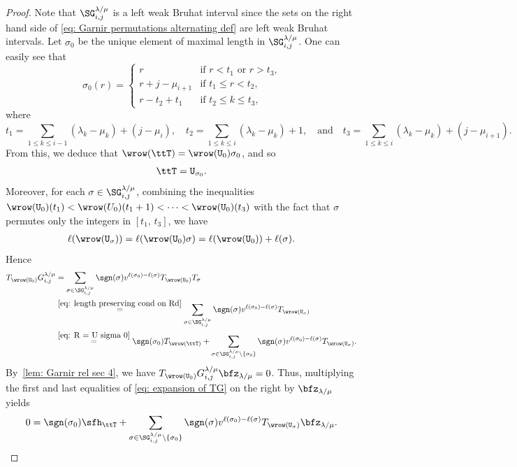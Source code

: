 \documentclass[12pt, reqno]{amsart}
\theoremstyle{plain}
\theoremstyle{definition}
\numberwithin{equation}{section}
\numberwithin{figure}{section}
\numberwithin{table}{section}
\begin{document}
\begin{proof}
Note that $\SG^{\lambda/\mu}_{i,j}$ is a left weak Bruhat interval since 
the sets on the right hand side of \cref{eq: Garnir permutations alternating def} are left weak Bruhat intervals.
Let $\sigma_0$ be the unique element of maximal length in $\SG^{\lambda/\mu}_{i,j}$.
One can easily see that
\[
\sigma_0(r) = \begin{cases}
r & \text{if $r < t_1$ or $r > t_3$,} \\
r + j - \mu_{i+1} & \text{if $t_1 \le r < t_2$,} \\
r - t_2 + t_1  & \text{if $t_2 \le k \le t_3$,}
\end{cases}
\]
where
\[
t_1 = \sum_{1 \leq k \leq i-1} (\lambda_k - \mu_k) + (j - \mu_i), \quad
t_2 = \sum_{1 \leq k \leq i} (\lambda_k - \mu_k) + 1, \quad \text{and} \quad
t_3 = \sum_{1 \leq k \leq i} (\lambda_k - \mu_k) + (j - \mu_{i+1}).
\]
From this, we deduce that $\wrow(\ttT) = \wrow(\mathtt{U}_0) \sigma_0$, and so
\begin{align}\label{eq: R = U sigma 0}
\ttT = \mathtt{U}_{\sigma_0}.
\end{align}
Moreover, for each $\sigma \in \SG^{\lambda/\mu}_{i,j}$,
combining the inequalities
$\wrow(\mathtt{U}_0)(t_1) < \wrow(U_0)(t_1 + 1) < \cdots < \wrow(\mathtt{U}_0)(t_3)$
with the fact that $\sigma$ permutes only the integers in $[t_1,\, t_3]$, we have
\begin{align}\label{eq: length preserving cond on Rd}
\ell(\wrow(\mathtt{U}_\sigma)) = \ell(\wrow(\mathtt{U}_0)\sigma)  = \ell(\wrow(\mathtt{U}_0)) + \ell(\sigma).
\end{align}
Hence
\begin{align}\label{eq: expansion of TG}
\begin{aligned}
T_{\wrow(\mathtt{U}_0)} G^{\lambda/\mu}_{i,j}
& = \sum_{\sigma \in \SG^{\lambda/\mu}_{i,j}} \sgn(\sigma) v^{\ell(\sigma_0) - \ell(\sigma)}
T_{\wrow(\mathtt{U}_0)} T_\sigma
\\
& \overset{\cref{eq: length preserving cond on Rd}}{=}  \sum_{\sigma \in \SG^{\lambda/\mu}_{i,j}} \sgn(\sigma) v^{\ell(\sigma_0) - \ell(\sigma)} T_{\wrow(\mathtt{U}_\sigma)} \\
& \overset{\cref{eq: R = U sigma 0}}{=} \sgn(\sigma_0) T_{\wrow(\ttT)} + 
\sum_{\sigma \in \SG^{\lambda/\mu}_{i,j} \setminus \{\sigma_0\}} \sgn(\sigma) v^{\ell(\sigma_0) - \ell(\sigma)} T_{\wrow(\mathtt{U}_\sigma)}.
\end{aligned}
\end{align}
By~\cref{lem: Garnir rel sec 4}, we have $T_{\wrow(\mathtt{U}_0)} G^{\lambda/\mu}_{i,j} \bfz_{\lambda/\mu} = 0$.
Thus, multiplying the first and last equalities of \cref{eq: expansion of TG} on the right by $\bfz_{\lambda/\mu}$ yields
\begin{align}\label{eq: expansion of hR}
0 = \sgn(\sigma_0)\sfh_{\ttT} + 
\sum_{\sigma \in \SG^{\lambda/\mu}_{i,j} \setminus \{\sigma_0\}} \sgn(\sigma) v^{\ell(\sigma_0) - \ell(\sigma)} T_{\wrow(\mathtt{U}_\sigma)} \bfz_{\lambda/\mu}.
\end{align}


\end{proof}
\end{document}

